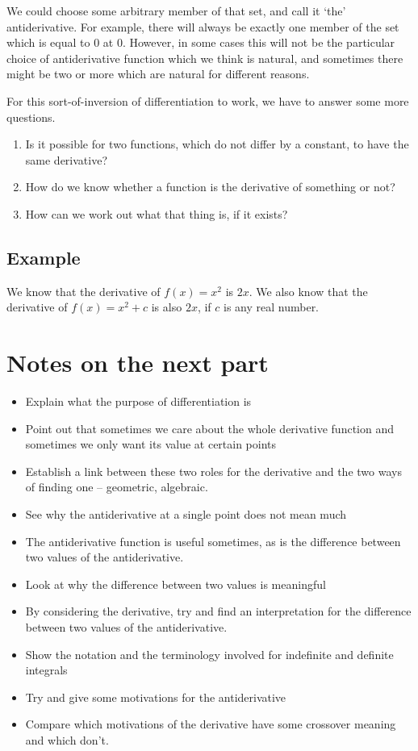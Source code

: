 We could choose some arbitrary member of that set, and call it `the' antiderivative. For example, there will always be exactly one member of the set which is equal to 0 at 0. However, in some cases this will not be the particular choice of antiderivative function which we think is natural, and sometimes there might be two or more which are natural for different reasons.  

For this sort-of-inversion of differentiation to work, we have to answer some more questions.
\begin{enumerate}
\item Is it possible for two functions, which do not differ by a constant, to have the same derivative?
\item How do we know whether a function is the derivative of something or not?
\item How can we work out what that thing is, if it exists?
\end{enumerate}

\subsection{Example}
We know that the derivative of $f(x) = x^2$ is $2x$. We also know that the derivative of $f(x) = x^2 + c$ is also $2x$, if $c$ is any real number. 

\section{Notes on the next part}
\begin{itemize}
\item Explain what the purpose of differentiation is
\item Point out that sometimes we care about the whole derivative function and sometimes we only want its value at certain points
\item Establish a link between these two roles for the derivative and the two ways of finding one -- geometric, algebraic.
\item See why the antiderivative at a single point does not mean much
\item The antiderivative function is useful sometimes, as is the difference between two values of the antiderivative.
\item Look at why the difference between two values is meaningful
\item By considering the derivative, try and find an interpretation for the difference between two values of the antiderivative.
\item Show the notation and the terminology involved for indefinite and definite integrals
\item Try and give some motivations for the antiderivative
\item Compare which motivations of the derivative have some crossover meaning and which don't.
\end{itemize}

